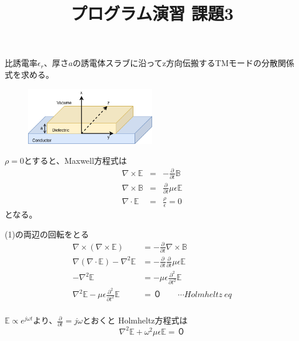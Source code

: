 \documentclass[a4paper,10pt]{bxjsarticle}
\title{プログラム演習 課題3}
\date{ }
\begin{document}
\maketitle


比誘電率$\epsilon_r$、厚さ$a$の誘電体スラブに沿ってz方向伝搬するTMモードの分散関係式を求める。

\begin{figure}[h]
    \centering
    \includegraphics[width=0.5\textwidth]{fig.png}
    \caption{}
    \label{fig:1}
\end{figure}

$\rho = 0$とすると、Maxwell方程式は
\begin{eqnarray}
    \nabla \times \mathbb{E} &=& - \frac{\partial}{\partial t} \mathbb{B} \\
    \nabla \times \mathbb{B} &=&  \frac{\partial}{\partial t} \mu \epsilon \mathbb{E} \\
    \nabla \cdot \mathbb{E} &=& \frac{\rho}{\epsilon} = 0
\end{eqnarray}
となる。

(1)の両辺の回転をとる
\begin{align*}
    \nabla \times \left(\nabla \times \mathbb{E}\right)
        &= - \frac{\partial}{\partial t} \nabla \times \mathbb{B} \\
    \nabla \left(\nabla \cdot \mathbb{E}\right) - \nabla^2 \mathbb{E}
        &= - \frac{\partial}{\partial t} \frac{\partial}{\partial t} \mu \epsilon \mathbb{E} \\
    - \nabla^2 \mathbb{E}
        &= - \mu \epsilon \frac{\partial^2}{\partial t^2} \mathbb{E} \\
    \nabla^2 \mathbb{E} - \mu \epsilon \frac{\partial^2}{\partial t^2} \mathbb{E}
        &= ０ \qquad \cdots Holmheltz \ eq \\
\end{align*}

$\mathbb{E} \propto e^{j\omega t}$より、$\frac{\partial}{\partial t} = j\omega$とおくと
Holmheltz方程式は
$$
\nabla^2 \mathbb{E} + \omega^2 \mu \epsilon \mathbb{E} = ０
$$
\end{document}
